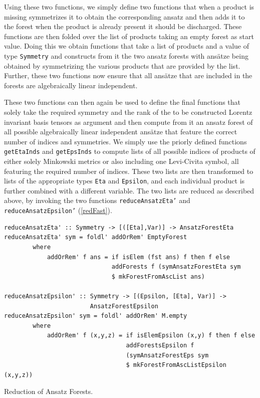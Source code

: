 \documentclass[a4paper,12pt, DIV=14, BCOR=5mm, twoside, headsepline, numbers=noenddot]{scrbook}
\begin{document}
Using these two functions, we simply define two functions that when a product is missing symmetrizes it to obtain the corresponding ansatz and then adds it to the forest when the product is already present it should be discharged. These functions are then folded over the list of products taking an empty forest as start value.  Doing this we obtain functions that take a list of products and a value of type \texttt{Symmetry} and constructs from it the two ansatz forests with ansätze being obtained by symmetrizing the various products that are provided by the list. Further, these two functions now ensure that all ansätze that are included in the forests are algebraically linear independent. 

These two functions can then again be used to define the final functions that solely take the required symmetry and the rank of the to be constructed Lorentz invariant basis tensors as argument and then compute from it an ansatz forest of all possible algebraically linear independent ansätze that feature the correct number of indices and symmetries. We simply use the priorly defined functions \texttt{getEtaInds} and \texttt{getEpsInds} to compute lists of all possible indices of products of either solely Minkowski metrics or also including one Levi-Civita symbol, all featuring the required number of indices. These two lists are then transformed to lists of the appropriate types \texttt{Eta} and \texttt{Epsilon}, and each individual product is further combined with a different variable. The two lists are reduced as described above, by invoking the two functions \texttt{reduceAnsatzEta'} and \texttt{reduceAnsatzEpsilon'} (\ref{redFast}).
\begin{listing}[hbt!]
\begin{verbatim}
reduceAnsatzEta' :: Symmetry -> [([Eta],Var)] -> AnsatzForestEta
reduceAnsatzEta' sym = foldl' addOrRem' EmptyForest
        where
            addOrRem' f ans = if isElem (fst ans) f then f else
                              addForests f (symAnsatzForestEta sym 
                              $ mkForestFromAscList ans)

reduceAnsatzEpsilon' :: Symmetry -> [(Epsilon, [Eta], Var)] ->
                        AnsatzForestEpsilon
reduceAnsatzEpsilon' sym = foldl' addOrRem' M.empty
        where
            addOrRem' f (x,y,z) = if isElemEpsilon (x,y) f then f else
                                  addForestsEpsilon f 
                                  (symAnsatzForestEps sym 
                                  $ mkForestFromAscListEpsilon (x,y,z))  
\end{verbatim} 
\caption{Reduction of Ansatz Forests.}\label{redFast}
\end{listing}
\end{document}
